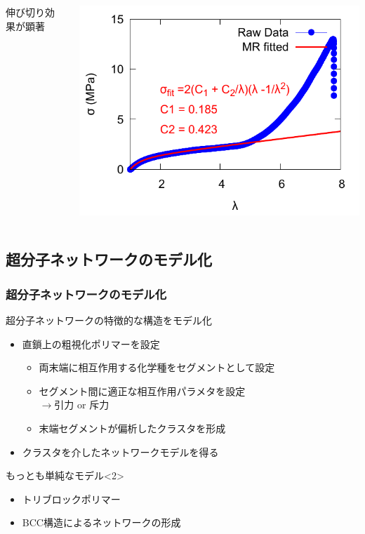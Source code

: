\documentclass[12pt, dvipdfmx]{beamer}
\begin{document}
\begin{frame}
\begin{columns}[T, totalwidth=\linewidth]
{\begin{itemize}
	伸び切り効果が顕著
	\end{itemize}
	}
	\includegraphics[width=\columnwidth]{./fig/SS_wMR_5_2.pdf}
\end{columns}
\end{frame}

\subsection{超分子ネットワークのモデル化}

\begin{frame}
\frametitle{超分子ネットワークのモデル化}
超分子ネットワークの特徴的な構造をモデル化
	\begin{itemize}
	\item
	直鎖上の粗視化ポリマーを設定
		\begin{itemize}
		\item
		両末端に相互作用する化学種をセグメントとして設定
		\item
		セグメント間に適正な相互作用パラメタを設定\\
		$\rightarrow$引力 or 斥力
		\item
		末端セグメントが偏析したクラスタを形成
		\end{itemize}
	\item
	クラスタを介したネットワークモデルを得る
	\end{itemize}

	\begin{alertblock}{もっとも単純なモデル}<2>
		\begin{itemize}
		\item 
		トリブロックポリマー
		\item 
		BCC構造によるネットワークの形成
		\end{itemize}
	\end{alertblock}
\end{frame}
\end{document}
